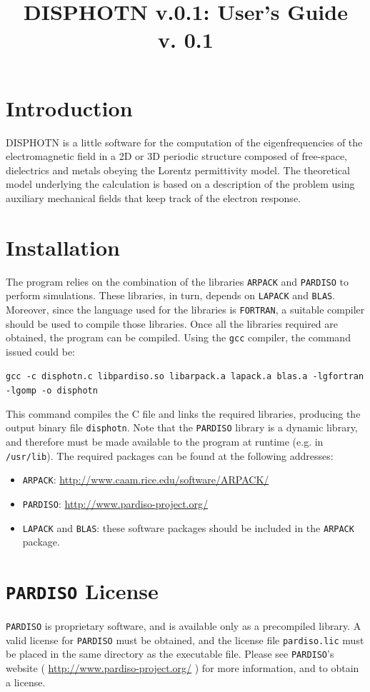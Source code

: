 \documentclass[11pt,a4paper,oneside]{article}
\begin{document}
\title{DISPHOTN v.0.1: User's Guide\\{\small v. 0.1}}
\maketitle
\newpage
\tableofcontents
\newpage

\section{Introduction}
DISPHOTN is a little software for the computation of the eigenfrequencies of the electromagnetic field in a 2D or 3D periodic structure composed of free-space, dielectrics and metals obeying the Lorentz permittivity model. The theoretical model underlying the calculation is based on a description of the problem using auxiliary mechanical fields that keep track of the electron response.

\section{Installation}
The program relies on the combination of the libraries {\tt ARPACK} and {\tt PARDISO} to perform simulations. These libraries, in turn, depends on {\tt LAPACK} and {\tt BLAS}. Moreover, since the language used for the libraries is {\tt FORTRAN}, a suitable compiler should be used to compile those libraries. Once all the libraries required are obtained, the program can be compiled. Using the {\tt gcc} compiler, the command issued could be:

{\tt gcc -c disphotn.c libpardiso.so libarpack.a lapack.a blas.a -lgfortran -lgomp -o disphotn}

This command compiles the C file and links the required libraries, producing the output binary file {\tt disphotn}. Note that the {\tt PARDISO} library is a dynamic library, and therefore must be made available to the program at runtime (e.g. in {\tt /usr/lib}).
The required packages can be found at the following addresses:
\begin{itemize}
\item {\tt ARPACK}: \url{http://www.caam.rice.edu/software/ARPACK/}
\item {\tt PARDISO}: \url{http://www.pardiso-project.org/}
\item {\tt LAPACK} and {\tt BLAS}: these software packages should be included in the {\tt ARPACK} package.
\end{itemize}

\section{{\tt PARDISO} License}
{\tt PARDISO} is proprietary software, and is available only as a precompiled library. A valid license for {\tt PARDISO} must be obtained, and the license file {\tt pardiso.lic} must be placed in the same directory as the executable file. Please see {\tt PARDISO}'s website ( \url{http://www.pardiso-project.org/} ) for more information, and to obtain a license.
\end{document}
